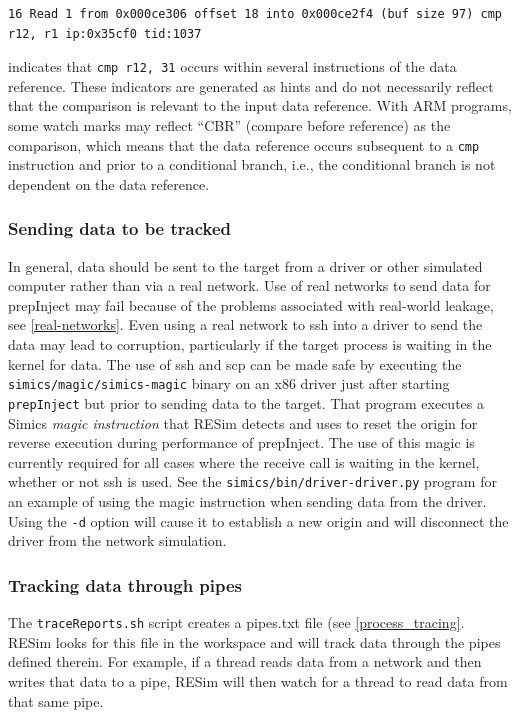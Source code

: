 \documentclass[titlepage]{article}
\begin{document}
\begin{verbatim}
16 Read 1 from 0x000ce306 offset 18 into 0x000ce2f4 (buf size 97) cmp r12, r1 ip:0x35cf0 tid:1037
\end{verbatim}
\noindent indicates that {\tt cmp r12, 31} occurs within several instructions of the data reference.  These indicators are generated as hints and do not necessarily reflect
that the comparison is relevant to the input data reference.  With ARM programs, some watch marks may reflect ``CBR'' (compare before reference) as the comparison, 
which means that the data reference occurs subsequent to a {\tt cmp} instruction and prior to a conditional branch, i.e., the conditional branch is not dependent on the data reference.

\subsubsection{Sending data to be tracked}
In general, data should be sent to the target from a driver or other simulated computer rather than via a real network.  Use of real networks to
send data for prepInject may fail because of the problems associated with real-world leakage, see \ref{real-networks}.
Even using a real network to ssh into a driver to send the data may lead to corruption, particularly if the target process is waiting in the 
kernel for data.  The use of ssh and scp can be made safe by executing the {\tt simics/magic/simics-magic} binary on an x86 driver just after
starting {\tt prepInject} but prior to sending data to the target.  That program executes a Simics \textit{magic instruction} that RESim 
detects and uses to reset the origin for reverse execution during performance of prepInject.  The use of this magic is currently required for all
cases where the receive call is waiting in the kernel, whether or not ssh is used.  See the {\tt simics/bin/driver-driver.py} program for an example
of using the magic instruction when sending data from the driver.  Using the {\tt -d} option will cause it to establish a new origin and will disconnect
the driver from the network simulation.

\subsubsection{Tracking data through pipes}
The {\tt traceReports.sh} script creates a pipes.txt file (see \ref{process_tracing}.   RESim looks for this file in the workspace and will track data through the
pipes defined therein.  For example, if a thread reads data from a network and then writes that data to a pipe, RESim will then watch for a thread
to read data from that same pipe.
\end{document}
